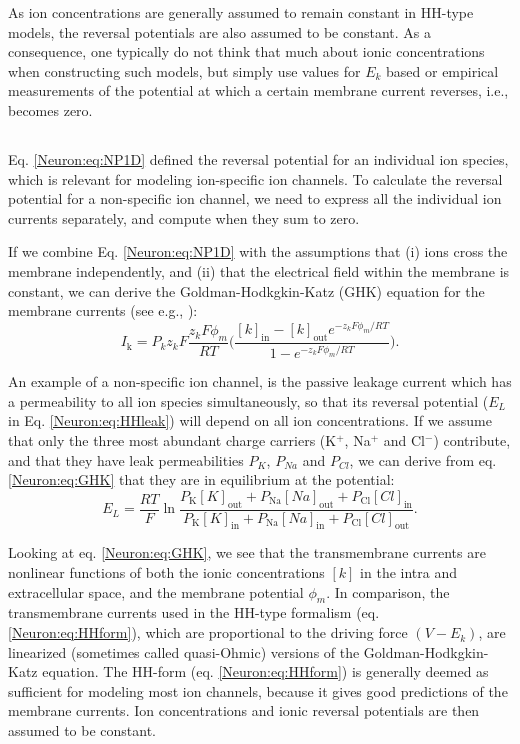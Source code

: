 As ion concentrations are generally assumed to remain constant in HH-type models, the reversal potentials are also assumed to be constant. As a consequence, one typically do not think that much about ionic concentrations when constructing such models, but simply use values for $E_k$ based or empirical measurements of the potential at which a certain membrane current reverses, i.e., becomes zero.

\subsection{}
\label{sec:Neuron:GHK}
Eq. \ref{Neuron:eq:NP1D} defined the reversal potential for an individual ion species, which is relevant for modeling ion-specific ion channels. To calculate the reversal potential for a non-specific ion channel, we need to express all the individual ion currents separately, and compute when they sum to zero. 

If we combine Eq. \ref{Neuron:eq:NP1D} with the assumptions that (i) ions cross the membrane independently, and (ii) that the electrical field within the membrane is constant, we can derive the Goldman-Hodkgkin-Katz (GHK) equation for the membrane currents (see e.g., \cite{hodgkin1949,johnston1994foundations}):
\begin{equation}
I_\text{k} = P_k z_k F \frac{z_k F \phi_m}{R T} \Big( \frac{[k]_\text{in}-[k]_\text{out} e^{-z_k F \phi_m/RT}} {1-e^{-z_k F \phi_m/RT}} \Big).
\label{Neuron:eq:GHK}
\end{equation}

An example of a non-specific ion channel, is the passive leakage current which has a permeability to all ion species simultaneously, so that its reversal potential ($E_L$ in Eq. \ref{Neuron:eq:HHleak}) will depend on all ion concentrations. If we assume that only the three most abundant charge carriers (K$^{+}$, Na$^{+}$ and Cl$^{-}$) contribute, and that they have leak permeabilities $P_K$, $P_{Na}$ and $P_{Cl}$, we can derive from eq. \ref{Neuron:eq:GHK} that they are in equilibrium at the potential:
\begin{equation}
E_L = \frac{R T}{F} 
\ln \frac{P_\text{K} [K]_\text{out}+P_\text{Na} [Na]_\text{out} + P_\text{Cl} [Cl]_\text{in}}
           {P_\text{K} [K]_\text{in}+P_\text{Na} [Na]_\text{in} + P_\text{Cl} [Cl]_\text{out}}.
\label{Neuron:eq:Eleak_GHK}
\end{equation}

Looking at eq. \ref{Neuron:eq:GHK}, we see that the transmembrane currents are nonlinear functions of both the ionic concentrations $[k]$ in the intra and extracellular space, and the membrane potential $\phi_m$. In comparison, the transmembrane currents used in the HH-type formalism (eq. \ref{Neuron:eq:HHform}), which are proportional to the driving force $(V-E_k)$, are linearized (sometimes called quasi-Ohmic) versions of the Goldman-Hodkgkin-Katz equation. The HH-form (eq. \ref{Neuron:eq:HHform}) is generally deemed as sufficient for modeling most ion channels, because it gives good predictions of the membrane currents. Ion concentrations and ionic reversal potentials are then assumed to be constant.


